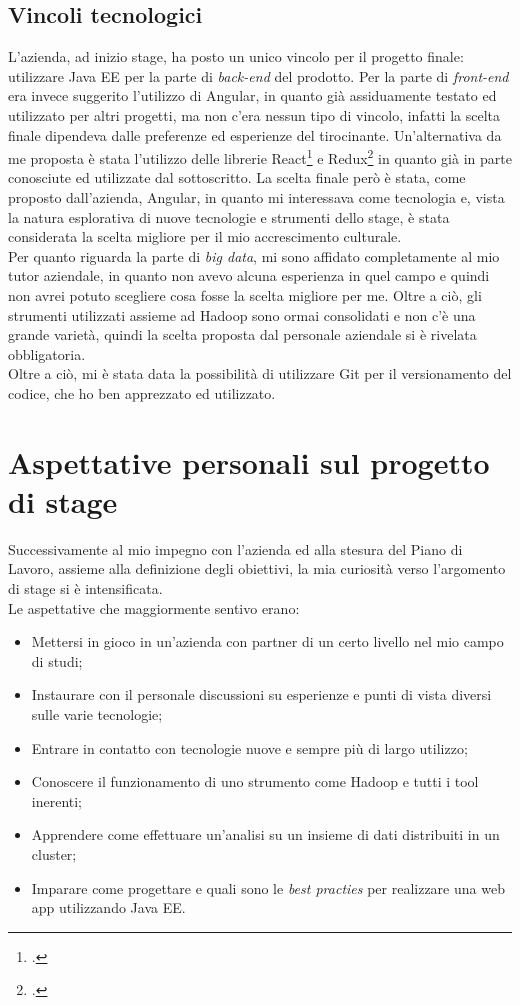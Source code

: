 \subsection{Vincoli tecnologici}
L'azienda, ad inizio stage, ha posto un unico vincolo per il progetto finale: utilizzare Java EE per la parte di \textit{back-end} del prodotto. Per la parte di \textit{front-end} era invece suggerito l'utilizzo di Angular, in quanto già assiduamente testato ed utilizzato per altri progetti, ma non c'era nessun tipo di vincolo, infatti la scelta finale dipendeva dalle preferenze ed esperienze del tirocinante. Un'alternativa da me proposta è stata l'utilizzo delle librerie React\footcite{https://reactjs.org/} e Redux\footcite{https://redux.js.org/} in quanto già in parte conosciute ed utilizzate dal sottoscritto. La scelta finale però è stata, come proposto dall'azienda, Angular, in  quanto mi interessava come tecnologia e, vista la natura esplorativa di nuove tecnologie e strumenti dello stage, è stata considerata la scelta migliore per il mio accrescimento culturale. \\
Per quanto riguarda la parte di \textit{big data}, mi sono affidato completamente al mio tutor aziendale, in quanto non avevo alcuna esperienza in quel campo e quindi non avrei potuto scegliere cosa fosse la scelta migliore per me. Oltre a ciò, gli strumenti utilizzati assieme ad Hadoop sono ormai consolidati e non c'è una grande varietà, quindi la scelta proposta dal personale aziendale si è rivelata obbligatoria. \\
Oltre a ciò, mi è stata data la possibilità di utilizzare \gls{Git} per il versionamento del codice, che ho ben apprezzato ed utilizzato.

\section{Aspettative personali sul progetto di stage}
Successivamente al mio impegno con l'azienda ed alla stesura del Piano di Lavoro, assieme alla definizione degli obiettivi, la mia curiosità verso l'argomento di stage si è intensificata. \\
Le aspettative che maggiormente sentivo erano:
\begin{itemize}
	\item Mettersi in gioco in un'azienda con partner di un certo livello nel mio campo di studi;
	\item Instaurare con il personale discussioni su esperienze e punti di vista diversi sulle varie tecnologie;
	\item Entrare in contatto con tecnologie nuove e sempre più di largo utilizzo;
	\item Conoscere il funzionamento di uno strumento come Hadoop e tutti i tool inerenti;
	\item Apprendere come effettuare un'analisi su un insieme di dati distribuiti in un \gls{cluster};
	\item Imparare come progettare e quali sono le \textit{best practies} per realizzare una \gls{web app} utilizzando Java EE.
\end{itemize}